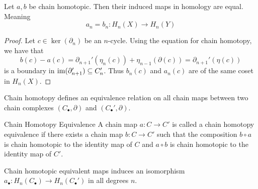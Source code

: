 \documentclass[a4paper]{article}
\begin{document}
\begin{lmm}{}{} Let $a,b$ be chain homotopic. Then their induced maps in homology are equal. Meaning $$a_n=b_n:H_n(X)\to H_n(Y)$$ \tcbline
\begin{proof}
Let $c\in\ker(\partial_n)$ be an $n$-cycle. Using the equation for chain homotopy, we have that $$b(c)-a(c)=\partial_{n+1}'(\eta_n(c))+\eta_{n-1}(\partial(c))=\partial_{n+1}'(\eta(c))$$ is a boundary in $\operatorname{im}(\partial_{n+1}')\subseteq C_n'$. Thus $b_n(c)$ and $a_n(c)$ are of the same coset in $H_n(X)$. 
\end{proof}
\end{lmm}

\begin{prp}{}{} Chain homotopy defines an equivalence relation on all chain maps between two chain complexes $(C_\bullet, \partial)$ and $(C_\bullet',\partial)$. 
\end{prp}

\begin{defn}{Chain Homotopy Equivalence}{} A chain map $a:C\to C'$ is called a chain homotopy equivalence if there exists a chain map $b:C\to C'$ such that the composition $b\circ a$ is chain homotopic to the identity map of $C$ and $a\circ b$ is chain homotopic to the identity map of $C'$. 
\end{defn}

\begin{lmm}{}{} Chain homotopic equivalent maps induces an isomorphism $a_\bullet:H_n(C_\bullet)\to H_n(C_\bullet')$ in all degrees $n$. 
\end{lmm}
\end{document}

